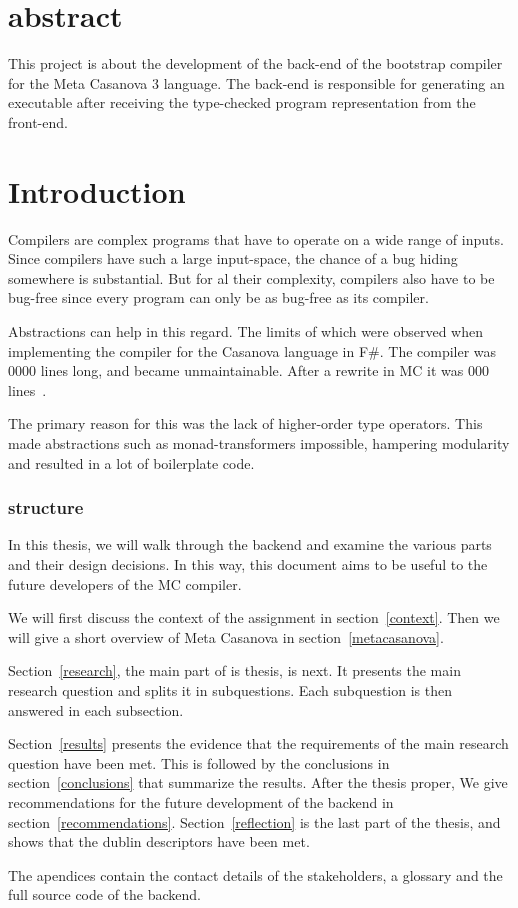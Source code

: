 \section*{abstract}
This project is about the development of the back-end of the bootstrap compiler for the Meta Casanova 3 language.
The back-end is responsible for generating an executable after receiving the type-checked program representation from the front-end.

\section{Introduction}
Compilers are complex programs that have to operate on a wide range of inputs.
Since compilers have such a large input-space, the chance of a bug hiding somewhere is substantial. 
But for al their complexity, compilers also have to be bug-free since every program can only be as bug-free as its compiler.

Abstractions can help in this regard.
The limits of which were observed when implementing the compiler for the Casanova language in F\#.
The compiler was 0000 lines long, and became unmaintainable.
After a rewrite in MC it was 000 lines~\cite{maggiore}.

The primary reason for this was the lack of higher-order type operators.
This made abstractions such as monad-transformers impossible, hampering modularity and resulted in a lot of boilerplate code.

\subsubsection{structure}

In this thesis, we will walk through the backend and examine the various parts and their design decisions.
In this way, this document aims to be useful to the future developers of the MC compiler.

We will first discuss the context of the assignment in section~\ref{context}.
Then we will give a short overview of Meta Casanova in section~\ref{metacasanova}.

Section~\ref{research}, the main part of is thesis, is next.
It presents the main research question and splits it in subquestions.
Each subquestion is then answered in each subsection.

Section~\ref{results} presents the evidence that the requirements of the main research question have been met.
This is followed by the conclusions in section~\ref{conclusions} that summarize the results.
After the thesis proper, We give recommendations for the future development of the backend in section~\ref{recommendations}.
Section~\ref{reflection} is the last part of the thesis, and shows that the dublin descriptors have been met.

The apendices contain the contact details of the stakeholders, a glossary and the full source code of the backend.
